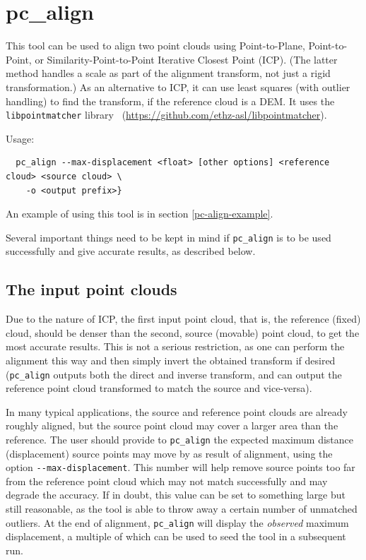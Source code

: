 \section{pc\_align}
\label{pcalign}

This tool can be used to align two point clouds using Point-to-Plane,
Point-to-Point, or Similarity-Point-to-Point Iterative Closest Point
(ICP). (The latter method handles a scale as part of the
alignment transform, not just a rigid transformation.) As an alternative
to ICP, it can use least squares (with outlier handling) to find the
transform, if the reference cloud is a DEM. It uses the
\texttt{libpointmatcher} library~\cite{Pomerleau12comp}
(\url{https://github.com/ethz-asl/libpointmatcher}).

\medskip
Usage:
\begin{verbatim}
  pc_align --max-displacement <float> [other options] <reference cloud> <source cloud> \
    -o <output prefix>}
\end{verbatim}

An example of using this tool is in section \ref{pc-align-example}.

Several important things need to be kept in mind if \texttt{pc\_align} is to be
used successfully and give accurate results, as described below.

\subsection{The input point clouds}

Due to the nature of ICP, the first input point cloud, that is, the
reference (fixed) cloud, should be denser than the second, source (movable)
point cloud, to get the most accurate results. This is not a serious
restriction, as one can perform the alignment this way and then simply
invert the obtained transform if desired (\texttt{pc\_align} outputs
both the direct and inverse transform, and can output the reference
point cloud transformed to match the source and vice-versa).

In many typical applications, the source and reference point clouds are
already roughly aligned, but the source point cloud may cover a larger
area than the reference. The user should provide to \texttt{pc\_align}
the expected maximum distance (displacement) source points may move by
as result of alignment, using the option
\texttt{-\/-max-displacement}. This number will help remove source
points too far from the reference point cloud which may not match
successfully and may degrade the accuracy. If in doubt, this value can
be set to something large but still reasonable, as the tool is able to
throw away a certain number of unmatched outliers. At the end of
alignment, \texttt{pc\_align} will display the {\it observed} maximum
displacement, a multiple of which can be used to seed the tool in a
subsequent run.

